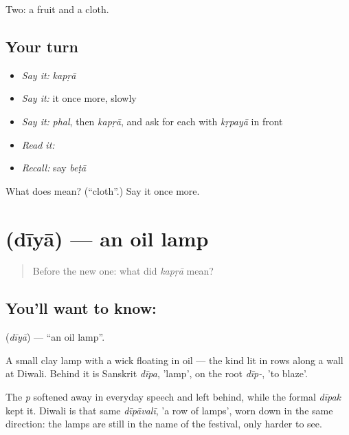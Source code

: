 \begin{grammarlens}[title={What you've built}]
Two: a fruit and a cloth.
\end{grammarlens}

\subsection*{Your turn}
\begin{itemize}
\raggedright
  \item \emph{Say it:} \emph{kapṛā}
  \item \emph{Say it:} it once more, slowly
  \item \emph{Say it:} \emph{phal}, then \emph{kapṛā}, and ask for each with \emph{kṛpayā} in front
  \item \emph{Read it:} \textbf{}
  \item \emph{Recall:} say \emph{beṭā}
\end{itemize}

\begin{tcolorbox}[breakable,colback=teal!4,colframe=teal!35!black,title={Before you move on}]
What does  mean? (\textquotedblleft{}cloth\textquotedblright{}.) Say it once more.
\end{tcolorbox}
\section[\texorpdfstring{\hi{दीया} (dīyā)}{दीया (dīyā)}]{ (dīyā) — an oil lamp}

\label{lesson:HI-C45-lamp}



\begin{quote}
Before the new one: what did \emph{kapṛā} mean?
\end{quote}

\subsection*{You'll want to know: }
\textbf{} (\emph{dīyā}) — \textquotedblleft{}an oil lamp\textquotedblright{}.

A small clay lamp with a wick floating in oil — the kind lit in rows along a wall at Diwali. Behind it is Sanskrit \emph{dīpa}, 'lamp', on the root \emph{dīp-}, 'to blaze'.

The \emph{p} softened away in everyday speech and left  behind, while the formal \emph{dīpak} kept it. Diwali is that same \emph{dīpāvalī}, 'a row of lamps', worn down in the same direction: the lamps are still in the name of the festival, only harder to see.


